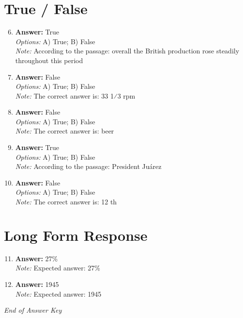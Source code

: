 \documentclass[12pt]{article}
\begin{document}
\section*{True / False}
\begin{enumerate}[label=\arabic*.]
\setcounter{enumi}{5}
\item \textbf{Answer:} True
\\ \textit{Options:} A) True; B) False
\\ \textit{Note:} According to the passage: overall the British production rose steadily throughout this period
\item \textbf{Answer:} False
\\ \textit{Options:} A) True; B) False
\\ \textit{Note:} The correct answer is: 33 1⁄3 rpm
\item \textbf{Answer:} False
\\ \textit{Options:} A) True; B) False
\\ \textit{Note:} The correct answer is: beer
\item \textbf{Answer:} True
\\ \textit{Options:} A) True; B) False
\\ \textit{Note:} According to the passage: President Juárez
\item \textbf{Answer:} False
\\ \textit{Options:} A) True; B) False
\\ \textit{Note:} The correct answer is: 12 th
\end{enumerate}

\section*{Long Form Response}
\begin{enumerate}[label=\arabic*.]
\setcounter{enumi}{10}
\item \textbf{Answer:} 27\%
\\ \textit{Note:} Expected answer: 27\%
\item \textbf{Answer:} 1945
\\ \textit{Note:} Expected answer: 1945
\end{enumerate}

\vfill
\noindent\textit{End of Answer Key}
\end{document}
